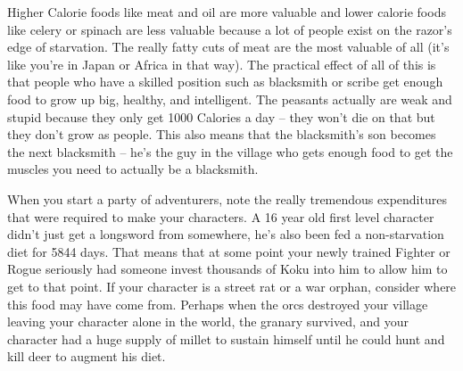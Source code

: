 Higher Calorie foods like meat and oil are more valuable and lower calorie foods like celery or spinach are less valuable because a lot of people exist on the razor's edge of starvation. The really fatty cuts of meat are the most valuable of all (it's like you're in Japan or Africa in that way). The practical effect of all of this is that people who have a skilled position such as blacksmith or scribe get enough food to grow up big, healthy, and intelligent. The peasants actually are weak and stupid because they only get 1000 Calories a day -- they won't die on that but they don't grow as people. This also means that the blacksmith's son becomes the next blacksmith -- he's the guy in the village who gets enough food to get the muscles you need to actually be a blacksmith.

When you start a party of adventurers, note the really tremendous expenditures that were required to make your characters. A 16 year old first level character didn't just get a longsword from somewhere, he's also been fed a non-starvation diet for 5844 days. That means that at some point your newly trained Fighter or Rogue seriously had someone invest thousands of Koku into him to allow him to get to that point. If your character is a street rat or a war orphan, consider where this food may have come from. Perhaps when the orcs destroyed your village leaving your character alone in the world, the granary survived, and your character had a huge supply of millet to sustain himself until he could hunt and kill deer to augment his diet.

